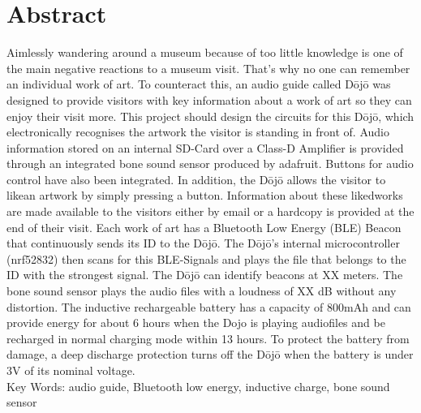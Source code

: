 \section*{Abstract}\label{sec:abstract}
Aimlessly wandering around a museum because of too little knowledge is one of the main negative reactions to a museum visit. That’s why no one can remember an individual work of art. To counteract this, an audio guide called Dōjō was designed to provide visitors with key information about a work of art so they can enjoy their visit more. This project should design the circuits for this Dōjō, which electronically recognises the artwork the visitor is standing in front of. Audio information stored on an internal SD-Card over a Class-D Amplifier is provided through an integrated bone sound sensor produced by adafruit. Buttons for audio control have also been integrated. In addition, the Dōjō allows the visitor to \glqq like\grqq an artwork by simply pressing a button. Information about these \glqq liked\grqq works are made available to the visitors either by email or a hardcopy is provided at the end of their visit. Each work of art has a Bluetooth Low Energy (BLE) Beacon that continuously sends its ID to the Dōjō. The Dōjō’s internal microcontroller (nrf52832) then scans for this BLE-Signals and plays the file that belongs to the ID with the strongest signal. The Dōjō can identify beacons at XX meters. The bone sound sensor plays the audio files with a loudness of XX dB without any distortion. The inductive rechargeable battery has a capacity of 800mAh and can provide energy for about 6 hours when the Dojo is playing audiofiles and be recharged in normal charging mode within 13 hours. To protect the battery from damage, a deep discharge protection turns off the Dōjō when the battery is under 3V of its nominal voltage.\\[0.25cm]
Key Words: audio guide, Bluetooth low energy, inductive charge, bone sound sensor